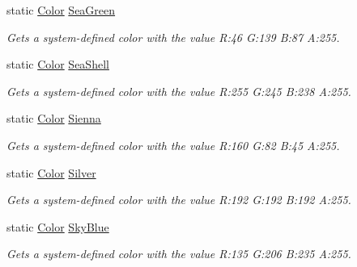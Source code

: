 \begin{DoxyCompactItemize}
static \hyperlink{struct_microsoft_1_1_xna_1_1_framework_1_1_color}{Color} \hyperlink{struct_microsoft_1_1_xna_1_1_framework_1_1_color_adeac6164af113d3dec9757cab91180eb}{Sea\+Green}
\begin{DoxyCompactList}\small\item\em Gets a system-\/defined color with the value R\+:46 G\+:139 B\+:87 A\+:255.\end{DoxyCompactList}\item 
static \hyperlink{struct_microsoft_1_1_xna_1_1_framework_1_1_color}{Color} \hyperlink{struct_microsoft_1_1_xna_1_1_framework_1_1_color_ad0d01823444688111465982240865d9a}{Sea\+Shell}
\begin{DoxyCompactList}\small\item\em Gets a system-\/defined color with the value R\+:255 G\+:245 B\+:238 A\+:255.\end{DoxyCompactList}\item 
static \hyperlink{struct_microsoft_1_1_xna_1_1_framework_1_1_color}{Color} \hyperlink{struct_microsoft_1_1_xna_1_1_framework_1_1_color_af68862f3f98b7f3a1693d2b0781ccdfd}{Sienna}
\begin{DoxyCompactList}\small\item\em Gets a system-\/defined color with the value R\+:160 G\+:82 B\+:45 A\+:255.\end{DoxyCompactList}\item 
static \hyperlink{struct_microsoft_1_1_xna_1_1_framework_1_1_color}{Color} \hyperlink{struct_microsoft_1_1_xna_1_1_framework_1_1_color_afac2e7cf466baf798c7edc2613462871}{Silver}
\begin{DoxyCompactList}\small\item\em Gets a system-\/defined color with the value R\+:192 G\+:192 B\+:192 A\+:255.\end{DoxyCompactList}\item 
static \hyperlink{struct_microsoft_1_1_xna_1_1_framework_1_1_color}{Color} \hyperlink{struct_microsoft_1_1_xna_1_1_framework_1_1_color_a3a7ce297b713fe8c11bc00c80562bccc}{Sky\+Blue}
\begin{DoxyCompactList}\small\item\em Gets a system-\/defined color with the value R\+:135 G\+:206 B\+:235 A\+:255.\end{DoxyCompactList}\item 

\end{DoxyCompactItemize}
